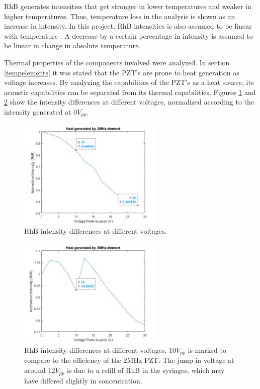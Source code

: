 \documentclass[twoside,twocolumn,9pt,a4paper]{IEEEtran}
\begin{document}
RhB generates intensities that get stronger in lower temperatures and weaker in higher temperatures. Thus, temperature loss in the analysis is shown as an increase in intensity. In this project, RhB intensities is also assumed to be linear with temperature \cite{Corato}. A decrease by a certain percentage in intensity is assumed to be linear in change  in absolute temperature.

Thermal properties of the components involved were analyzed. In section \ref{tempelements} it was stated that the PZT's are prone to heat generation as voltage increases. By analyzing the capabilities of the PZT's as a heat source, its acoustic capabilities can be separated from its thermal capabilities. Figures \ref{2MHzHeat} and \ref{5MHzHeat} show the intensity differences at different voltages, normalized according to the intensity generated at $0 V_{pp}$.

\begin{figure}[H]
\begin{center}
\includegraphics[width=7cm]{Images/Images from Jonte/heat generated by 2mhz element.png} %
\caption{RhB intensity differences at different voltages.}
\label{2MHzHeat}
\end{center}
\end{figure} %

\begin{figure}[H]
\begin{center}
\includegraphics[width=7cm]{Images/Images from Jonte/heat generated by 5mhz element.png} %
\caption{RhB intensity differences at different voltages. $10 V_{pp}$ is marked to compare to the efficiency of the 2MHz PZT. The jump in voltage at around $12 V_{pp}$ is due to a refill of RhB in the syringes, which may have differed slightly in concentration.}
\label{5MHzHeat}
\end{center}
\end{figure} %
\end{document}
